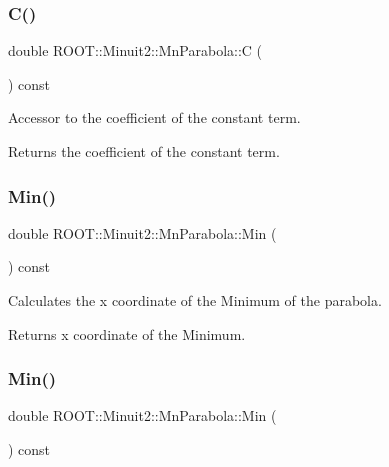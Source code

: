 \subsubsection{\texorpdfstring{C()}{C()}\hspace{0.1cm}{\footnotesize\ttfamily [2/2]}}
{\footnotesize\ttfamily double R\+O\+O\+T\+::\+Minuit2\+::\+Mn\+Parabola\+::C (\begin{DoxyParamCaption}{ }\end{DoxyParamCaption}) const\hspace{0.3cm}{\ttfamily [inline]}}

Accessor to the coefficient of the constant term.

\begin{DoxyReturn}{Returns}
the coefficient of the constant term. 
\end{DoxyReturn}
\mbox{\label{classROOT_1_1Minuit2_1_1MnParabola_ab3c7e51f6276d9ebf6d28fe965914bc8}} 
\subsubsection{\texorpdfstring{Min()}{Min()}\hspace{0.1cm}{\footnotesize\ttfamily [1/2]}}
{\footnotesize\ttfamily double R\+O\+O\+T\+::\+Minuit2\+::\+Mn\+Parabola\+::\+Min (\begin{DoxyParamCaption}{ }\end{DoxyParamCaption}) const\hspace{0.3cm}{\ttfamily [inline]}}

Calculates the x coordinate of the Minimum of the parabola.

\begin{DoxyReturn}{Returns}
x coordinate of the Minimum. 
\end{DoxyReturn}
\mbox{\label{classROOT_1_1Minuit2_1_1MnParabola_ab3c7e51f6276d9ebf6d28fe965914bc8}} 
\subsubsection{\texorpdfstring{Min()}{Min()}\hspace{0.1cm}{\footnotesize\ttfamily [2/2]}}
{\footnotesize\ttfamily double R\+O\+O\+T\+::\+Minuit2\+::\+Mn\+Parabola\+::\+Min (\begin{DoxyParamCaption}{ }\end{DoxyParamCaption}) const\hspace{0.3cm}{\ttfamily [inline]}}

